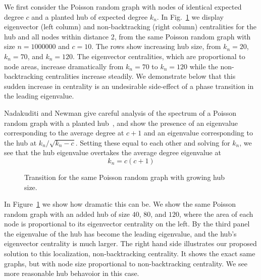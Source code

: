 \documentclass[twocolumn,prl,superscriptaddress]{revtex4}
\begin{document}
We first consider the Poisson random graph with nodes of identical expected degree $c$ and a planted hub of expected degree $k_n$. In Fig.~\ref{fig:transition} we display eigenvector (left column) and non-backtracking (right column) centralities for the hub and all nodes within distance 2, from the same Poisson random graph with size $n=1000000$ and $c = 10$. The rows show increasing hub size, from $k_n = 20$, $k_n = 70$, and $k_n = 120$. The eigenvector centralities, which are proportional to node areas, increase dramatically from $k_n = 70$ to $k_n = 120$ while the non-backtracking centralities increase steadily. We demonstrate below that this sudden increase in centrality is an undesirable side-effect of a phase transition in the leading eigenvalue.

Nadakuditi and Newman give careful analysis of the spectrum of a Poisson random graph with a planted hub~\cite{nadakuditi13}, and show the presence of an eigenvalue corresponding to the average degree at $c+1$ and an eigenvalue corresponding to the hub at $k_n / \sqrt{k_n - c}$. Setting these equal to each other and solving for $k_n$, we see that the hub eigenvalue overtakes the average degree eigenvalue at
\begin{equation}
k_n = c(c+1)
\end{equation}


\begin{figure}
\begin{center}
\end{center}
\caption{Transition for the same Poisson random graph with growing hub size.}
\label{fig:transition}
\end{figure}

In Figure~\ref{fig:transition} we show how dramatic this can be. We show the same Poisson random graph with an added hub of size $40$, $80$, and $120$, where the area of each node is proportional to its eigenvector centrality on the left. By the third panel the eigenvalue of the hub has become the leading eigenvalue, and the hub's eigenvector centrality is much larger. The right hand side illustrates our proposed solution to this localization, non-backtracking centrality. It shows the exact same graphs, but with node size proportional to non-backtracking centrality. We see more reasonable hub behavoior in this case.
\end{document}
